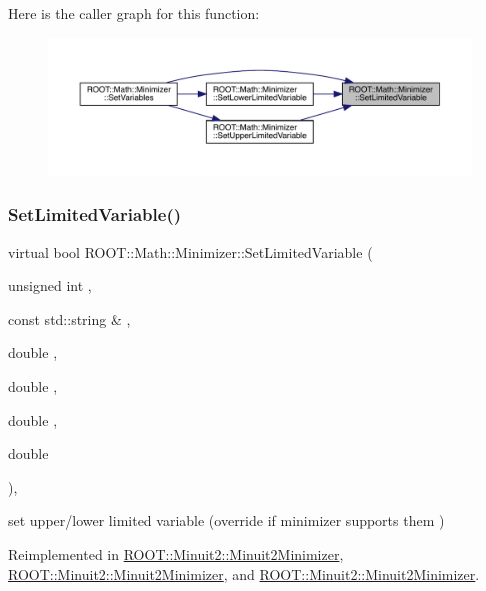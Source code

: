 Here is the caller graph for this function\+:
\nopagebreak
\begin{figure}[H]
\begin{center}
\leavevmode
\includegraphics[width=350pt]{dc/dc4/classROOT_1_1Math_1_1Minimizer_a4303530cbb62ceb7cf9c9ebcbde530c2_icgraph}
\end{center}
\end{figure}
\mbox{\label{classROOT_1_1Math_1_1Minimizer_a4303530cbb62ceb7cf9c9ebcbde530c2}} 
\subsubsection{\texorpdfstring{SetLimitedVariable()}{SetLimitedVariable()}\hspace{0.1cm}{\footnotesize\ttfamily [3/3]}}
{\footnotesize\ttfamily virtual bool R\+O\+O\+T\+::\+Math\+::\+Minimizer\+::\+Set\+Limited\+Variable (\begin{DoxyParamCaption}\item[{unsigned int}]{,  }\item[{const std\+::string \&}]{,  }\item[{double}]{,  }\item[{double}]{,  }\item[{double}]{,  }\item[{double}]{ }\end{DoxyParamCaption})\hspace{0.3cm}{\ttfamily [inline]}, {\ttfamily [virtual]}}



set upper/lower limited variable (override if minimizer supports them ) 



Reimplemented in \mbox{\hyperlink{classROOT_1_1Minuit2_1_1Minuit2Minimizer_a30385295df6a6b784aa59de7f00e4d23}{R\+O\+O\+T\+::\+Minuit2\+::\+Minuit2\+Minimizer}}, \mbox{\hyperlink{classROOT_1_1Minuit2_1_1Minuit2Minimizer_a30385295df6a6b784aa59de7f00e4d23}{R\+O\+O\+T\+::\+Minuit2\+::\+Minuit2\+Minimizer}}, and \mbox{\hyperlink{classROOT_1_1Minuit2_1_1Minuit2Minimizer_a30385295df6a6b784aa59de7f00e4d23}{R\+O\+O\+T\+::\+Minuit2\+::\+Minuit2\+Minimizer}}.

